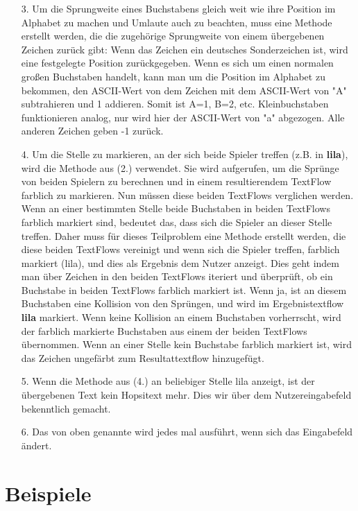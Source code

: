 \documentclass[a4paper,10pt,ngerman]{scrartcl}
\begin{document}
\begin{itemize}
\begin{itemize}
  \end{itemize}
  \item [3.] Um die Sprungweite eines Buchstabens gleich weit wie ihre Position im Alphabet zu machen und Umlaute auch zu beachten, muss eine Methode erstellt werden, die die zugehörige Sprungweite von einem übergebenen Zeichen zurück gibt:
  \newline
  Wenn das Zeichen ein deutsches Sonderzeichen ist, wird eine festgelegte Position zurückgegeben. Wenn es sich um einen normalen großen Buchstaben handelt, kann man um die Position im Alphabet zu bekommen, den ASCII-Wert von dem Zeichen mit dem ASCII-Wert von "A" subtrahieren und 1 addieren. Somit ist A=1, B=2, etc.
  Kleinbuchstaben funktionieren analog, nur wird hier der ASCII-Wert von "a" abgezogen. Alle anderen Zeichen geben -1 zurück.
  \item[4.] Um die Stelle zu markieren, an der sich beide Spieler treffen (z.B. in \textbf{lila}), wird die Methode aus (2.) verwendet. Sie wird aufgerufen, um die Sprünge von beiden Spielern zu berechnen und in einem resultierendem TextFlow farblich zu markieren.
  Nun müssen diese beiden TextFlows verglichen werden. Wenn an einer bestimmten Stelle beide Buchstaben in beiden TextFlows farblich markiert sind, bedeutet das, dass sich die Spieler an dieser Stelle treffen. Daher muss für dieses Teilproblem eine Methode erstellt werden, die diese beiden TextFlows vereinigt und 
  wenn sich die Spieler treffen, farblich markiert (lila), und dies als Ergebnis dem Nutzer anzeigt.
  \newline Dies geht indem man über Zeichen in den beiden TextFlows iteriert und überprüft, ob ein Buchstabe in beiden TextFlows farblich markiert ist. Wenn ja, ist an diesem Buchstaben eine Kollision von den Sprüngen, und wird im Ergebnistextflow \textbf{lila} markiert.
  Wenn keine Kollision an einem Buchstaben vorherrscht, wird der farblich markierte Buchstaben aus einem der beiden TextFlows übernommen. Wenn an einer Stelle kein Buchstabe farblich markiert ist, wird das Zeichen ungefärbt zum Resultattextflow hinzugefügt. 
  \item[5.] Wenn die Methode aus (4.) an beliebiger Stelle lila anzeigt, ist der übergebenen Text kein Hopsitext mehr. Dies wir über dem Nutzereingabefeld bekenntlich gemacht.
  \item[6.] Das von oben genannte wird jedes mal ausführt, wenn sich das Eingabefeld ändert.
\end{itemize}

\section{Beispiele}
\end{document}
